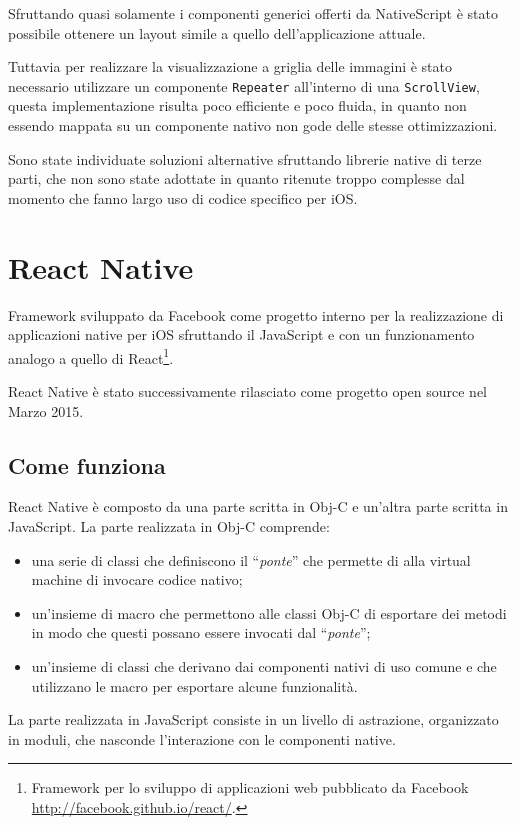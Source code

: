 Sfruttando quasi solamente i componenti generici offerti da NativeScript è stato possibile ottenere un layout simile a quello dell'applicazione attuale.

Tuttavia per realizzare la visualizzazione a griglia delle immagini è stato necessario utilizzare un componente \texttt{Repeater} all'interno di una \texttt{ScrollView}, questa implementazione risulta poco efficiente e poco fluida, in quanto non essendo mappata su un componente nativo non gode delle stesse ottimizzazioni.

Sono state individuate soluzioni alternative sfruttando librerie native di terze parti, che non sono state adottate in quanto ritenute troppo complesse dal momento che fanno largo uso di codice specifico per iOS.

\FloatBarrier
\section{React Native}

Framework sviluppato da Facebook come progetto interno per la realizzazione di applicazioni native per iOS sfruttando il JavaScript e con un funzionamento analogo a quello di React\footnote{Framework per lo sviluppo di applicazioni web pubblicato da Facebook \url{http://facebook.github.io/react/}.}.

React Native è stato successivamente rilasciato come progetto open source nel Marzo 2015.

\subsection{Come funziona}

React Native è composto da una parte scritta in Obj-C e un'altra parte scritta in JavaScript.
La parte realizzata in Obj-C comprende:
\begin{itemize}
\item una serie di classi che definiscono il ``\textit{ponte}'' che permette di alla virtual machine di invocare codice nativo;
\item un'insieme di macro che permettono alle classi Obj-C di esportare dei metodi in modo che questi possano essere invocati dal ``\textit{ponte}'';
\item un'insieme di classi che derivano dai componenti nativi di uso comune e che utilizzano le macro per esportare alcune funzionalità.
\end{itemize}
La parte realizzata in JavaScript consiste in un livello di astrazione, organizzato in moduli, che nasconde l'interazione con le componenti native.

